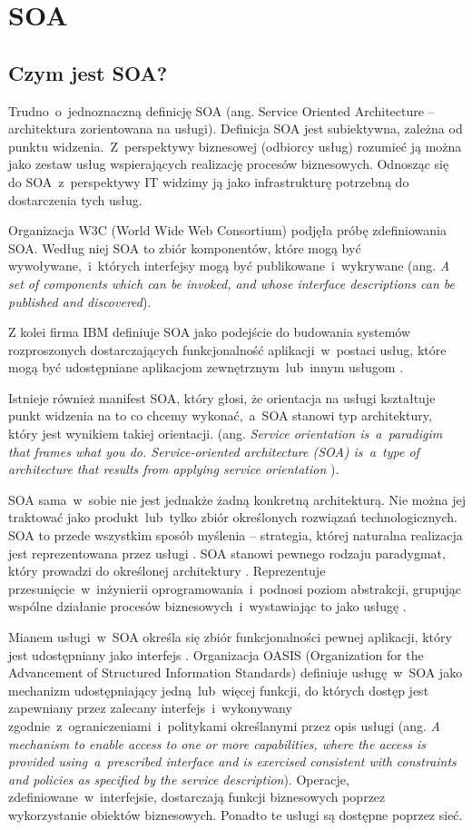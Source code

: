 \section{SOA}
\subsection{Czym jest SOA?}
Trudno~o~jednoznaczną definicję SOA (ang. Service Oriented Architecture – architektura zorientowana na usługi). Definicja SOA jest subiektywna, zależna od punktu widzenia.~Z~perspektywy biznesowej (odbiorcy usług) rozumieć ją można jako zestaw usług wspierających realizację procesów biznesowych. Odnosząc się do SOA~z~perspektywy IT widzimy ją jako infrastrukturę potrzebną do dostarczenia tych usług.
	
Organizacja W3C (World Wide Web Consortium) podjęła próbę zdefiniowania SOA. Według niej SOA to zbiór komponentów, które mogą być wywoływane,~i~których interfejsy mogą być publikowane~i~wykrywane (ang. \emph{A set of components which can be invoked, and whose interface descriptions can be published and discovered}).

Z kolei firma IBM definiuje SOA jako podejście do budowania systemów rozproszonych dostarczających funkcjonalność aplikacji~w~postaci usług, które mogą być udostępniane aplikacjom zewnętrznym~lub~innym usługom \cite{PlatIntGor}.

Istnieje również manifest SOA, który głosi, że orientacja na usługi kształtuje punkt widzenia na to co chcemy wykonać,~a~SOA stanowi typ architektury, który jest wynikiem takiej orientacji. (ang. \emph{Service orientation is~a~paradigim that frames what you do. Service-oriented architecture (SOA) is~a~type of architecture that results from applying service orientation} \cite{SOAManifestoOrg}). 

SOA sama~w~sobie nie jest jednakże żadną konkretną architekturą. Nie można jej traktować jako produkt~lub~tylko zbiór określonych rozwiązań technologicznych. SOA to przede wszystkim sposób myślenia – strategia, której naturalna realizacja jest reprezentowana przez usługi \cite{SOAsdj102009,SOAwJBBC}. SOA stanowi pewnego rodzaju paradygmat, który prowadzi do określonej architektury \cite{SOAsdj102009}. Reprezentuje przesunięcie~w~inżynierii oprogramowania~i~podnosi poziom abstrakcji, grupując wspólne działanie procesów biznesowych~i~wystawiając to jako usługę \cite{CompSOAMet}.
	
Mianem usługi~w~SOA określa się zbiór funkcjonalności pewnej aplikacji, który jest udostępniany jako interfejs \cite{SOAawidptas}. Organizacja OASIS (Organization for the Advancement of Structured Information Standards) definiuje usługę~w~SOA jako mechanizm udostępniający jedną~lub~więcej funkcji, do których dostęp jest zapewniany przez zalecany interfejs~i~wykonywany zgodnie~z~ograniczeniami~i~politykami określanymi przez opis usługi (ang. \emph{A mechanism to enable access to one or more capabilities, where the access is provided using~a~prescribed interface and is exercised consistent with constraints and policies as specified by the service description}). Operacje, zdefiniowane~w~interfejsie, dostarczają funkcji biznesowych poprzez wykorzystanie obiektów biznesowych. Ponadto te usługi są dostępne poprzez sieć.

